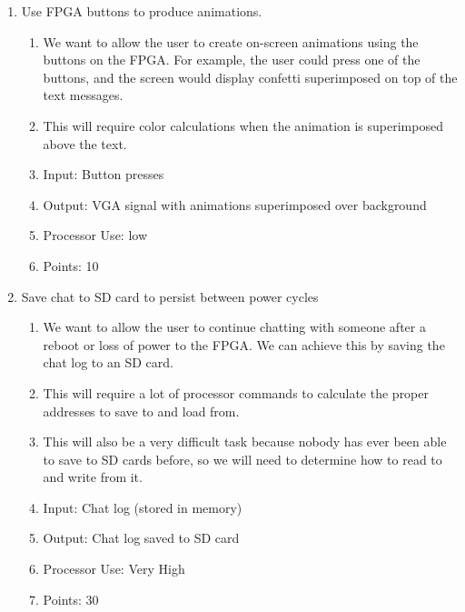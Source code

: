 \documentclass[letterpaper]{article}
\begin{document}
\begin{enumerate}
\item Use FPGA buttons to produce animations.
\begin{enumerate}
\item We want to allow the user to create on-screen animations using the buttons on the FPGA. For example, the user could press one of the buttons, and the screen would display confetti superimposed on top of the text messages.
\item This will require color calculations when the animation is superimposed above the text.
\item Input: Button presses
\item Output: VGA signal with animations superimposed over background
\item Processor Use: low
\item Points: 10
\end{enumerate}

\item Save chat to SD card to persist between power cycles
\begin{enumerate}
\item We want to allow the user to continue chatting with someone after a reboot or loss of power to the FPGA. We can achieve this by saving the chat log to an SD card.
\item This will require a lot of processor commands to calculate the proper addresses to save to and load from.
\item This will also be a very difficult task because nobody has ever been able to save to SD cards before, so we will need to determine how to read to and write from it.
\item Input: Chat log (stored in memory)
\item Output: Chat log saved to SD card
\item Processor Use: Very High
\item Points: 30
\end{enumerate}
\end{enumerate}
\end{document}
